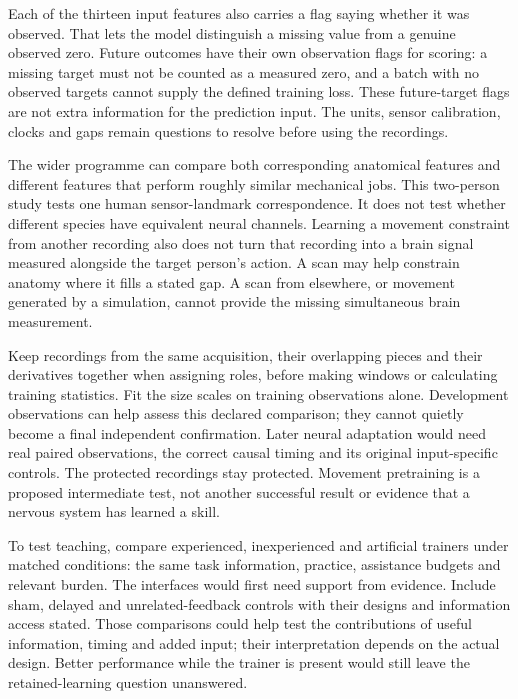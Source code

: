 Each of the thirteen input features also carries a flag saying whether it was observed. That lets the model distinguish a missing value from a genuine observed zero. Future outcomes have their own observation flags for scoring: a missing target must not be counted as a measured zero, and a batch with no observed targets cannot supply the defined training loss. These future-target flags are not extra information for the prediction input. The units, sensor calibration, clocks and gaps remain questions to resolve before using the recordings.\par

The wider programme can compare both corresponding anatomical features and different features that perform roughly similar mechanical jobs. This two-person study tests one human sensor-landmark correspondence. It does not test whether different species have equivalent neural channels. Learning a movement constraint from another recording also does not turn that recording into a brain signal measured alongside the target person's action. A scan may help constrain anatomy where it fills a stated gap. A scan from elsewhere, or movement generated by a simulation, cannot provide the missing simultaneous brain measurement.\par

Keep recordings from the same acquisition, their overlapping pieces and their derivatives together when assigning roles, before making windows or calculating training statistics. Fit the size scales on training observations alone. Development observations can help assess this declared comparison; they cannot quietly become a final independent confirmation. Later neural adaptation would need real paired observations, the correct causal timing and its original input-specific controls. The protected recordings stay protected. Movement pretraining is a proposed intermediate test, not another successful result or evidence that a nervous system has learned a skill.\par

To test teaching, compare experienced, inexperienced and artificial trainers under matched conditions: the same task information, practice, assistance budgets and relevant burden. The interfaces would first need support from evidence. Include sham, delayed and unrelated-feedback controls with their designs and information access stated. Those comparisons could help test the contributions of useful information, timing and added input; their interpretation depends on the actual design. Better performance while the trainer is present would still leave the retained-learning question unanswered.\par

